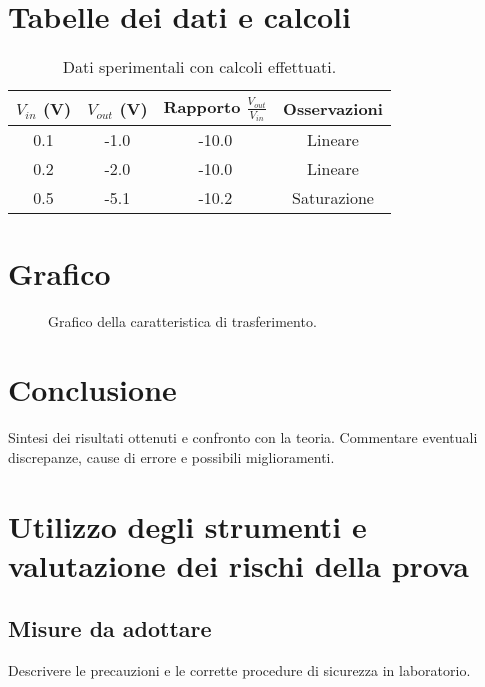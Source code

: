\section{Tabelle dei dati e calcoli}
\begin{table}[H]
\centering
{}
\begin{tabular}{@{}|c|c|c|c|@{}}
\toprule
$V_{in}$ (V) & $V_{out}$ (V) & Rapporto $\frac{V_{out}}{V_{in}}$ & Osservazioni \\ \midrule
0.1 & -1.0 & -10.0 & Lineare \\
0.2 & -2.0 & -10.0 & Lineare \\
0.5 & -5.1 & -10.2 & Saturazione \\ \bottomrule
\end{tabular}
\caption{Dati sperimentali con calcoli effettuati.}
\end{table}

\section{Grafico}
\begin{figure}[H]
\centering
{}
\caption{Grafico della caratteristica di trasferimento.}
\end{figure}

\section{Conclusione}
Sintesi dei risultati ottenuti e confronto con la teoria.  
Commentare eventuali discrepanze, cause di errore e possibili miglioramenti.

\section{Utilizzo degli strumenti e valutazione dei rischi della prova}
\subsection{Misure da adottare}
Descrivere le precauzioni e le corrette procedure di sicurezza in laboratorio.
